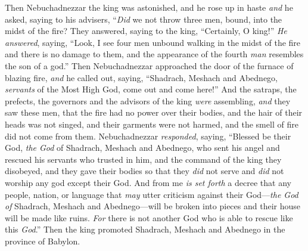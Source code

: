 \begin{biblechapter}
\verse Then Nebuchadnezzar the king was astonished, and he rose up in haste \textit{and} he asked, saying to his advisers, “\textit{Did} we not throw three men, bound, into the midst of the fire? They answered, saying to the king, “Certainly, O king!”
\verse \textit{He answered}, saying, “Look, I see four men unbound walking in the midst of the fire and there is no damage to them, and the appearance of the fourth \textit{man} resembles the son of a god.”
\verse Then Nebuchadnezzar approached the door of the furnace of blazing fire, \textit{and} he called out, saying, “Shadrach, Meshach and Abednego, \textit{servants} of the Most High God, come out and come here!”
\verse And the satraps, the prefects, the governors and the advisors of the king \textit{were} assembling, \textit{and} they saw these men, that the fire had no power over their bodies, and the hair of their heads was not singed, and their garments were not harmed, and the smell of fire did not come from them.
 Nebuchadnezzar \textit{responded}, saying, “Blessed be their God, \textit{the God} of Shadrach, Meshach and Abednego, who sent his angel and rescued his servants who trusted in him, and the command of the king they disobeyed, and they gave their bodies so that they \textit{did} not serve and \textit{did} not worship any god except their God.
\verse And from me \textit{is set forth} a decree that any people, nation, or language that \textit{may} utter criticism against their God—\textit{the God of} Shadrach, Meshach and Abednego—will be broken into pieces and their house will be made like ruins. \textit{For} there is not another God who is able to rescue like this \textit{God}.”
\verse Then the king promoted Shadrach, Meshach and Abednego in the province of Babylon.
\end{biblechapter}

